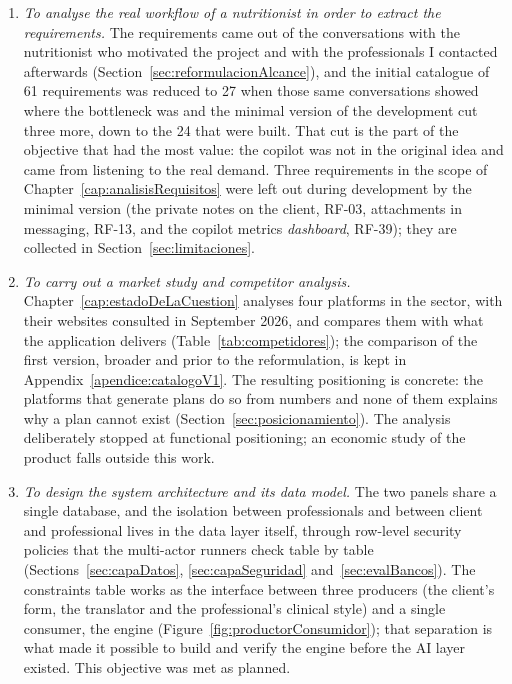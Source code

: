\begin{enumerate}
    \item \textit{To analyse the real workflow of a nutritionist in order to extract the requirements.} The requirements came out of the conversations with the nutritionist who motivated the project and with the professionals I contacted afterwards (Section~\ref{sec:reformulacionAlcance}), and the initial catalogue of 61 requirements was reduced to 27 when those same conversations showed where the bottleneck was and the minimal version of the development cut three more, down to the 24 that were built. That cut is the part of the objective that had the most value: the copilot was not in the original idea and came from listening to the real demand. Three requirements in the scope of Chapter~\ref{cap:analisisRequisitos} were left out during development by the minimal version (the private notes on the client, RF-03, attachments in messaging, RF-13, and the copilot metrics \textit{dashboard}, RF-39); they are collected in Section~\ref{sec:limitaciones}.

    \item \textit{To carry out a market study and competitor analysis.} Chapter~\ref{cap:estadoDeLaCuestion} analyses four platforms in the sector, with their websites consulted in September 2026, and compares them with what the application delivers (Table~\ref{tab:competidores}); the comparison of the first version, broader and prior to the reformulation, is kept in Appendix~\ref{apendice:catalogoV1}. The resulting positioning is concrete: the platforms that generate plans do so from numbers and none of them explains why a plan cannot exist (Section~\ref{sec:posicionamiento}). The analysis deliberately stopped at functional positioning; an economic study of the product falls outside this work.

    \item \textit{To design the system architecture and its data model.} The two panels share a single database, and the isolation between professionals and between client and professional lives in the data layer itself, through row-level security policies that the multi-actor runners check table by table (Sections~\ref{sec:capaDatos}, \ref{sec:capaSeguridad} and~\ref{sec:evalBancos}). The constraints table works as the interface between three producers (the client's form, the translator and the professional's clinical style) and a single consumer, the engine (Figure~\ref{fig:productorConsumidor}); that separation is what made it possible to build and verify the engine before the AI layer existed. This objective was met as planned.


\end{enumerate}
